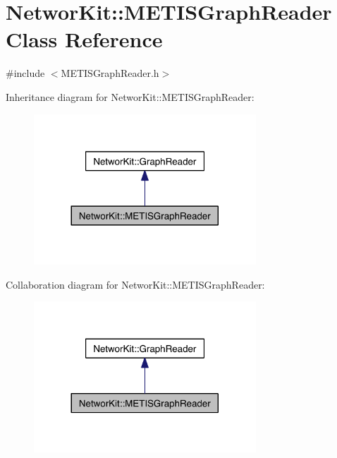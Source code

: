 \hypertarget{class_networ_kit_1_1_m_e_t_i_s_graph_reader}{\section{Networ\-Kit\-:\-:M\-E\-T\-I\-S\-Graph\-Reader Class Reference}
\label{class_networ_kit_1_1_m_e_t_i_s_graph_reader}
}


{\ttfamily \#include $<$M\-E\-T\-I\-S\-Graph\-Reader.\-h$>$}



Inheritance diagram for Networ\-Kit\-:\-:M\-E\-T\-I\-S\-Graph\-Reader\-:\nopagebreak
\begin{figure}[H]
\begin{center}
\leavevmode
\includegraphics[width=236pt]{class_networ_kit_1_1_m_e_t_i_s_graph_reader__inherit__graph}
\end{center}
\end{figure}


Collaboration diagram for Networ\-Kit\-:\-:M\-E\-T\-I\-S\-Graph\-Reader\-:\nopagebreak
\begin{figure}[H]
\begin{center}
\leavevmode
\includegraphics[width=236pt]{class_networ_kit_1_1_m_e_t_i_s_graph_reader__coll__graph}
\end{center}
\end{figure}
